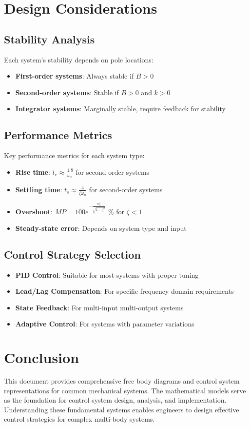 \documentclass[12pt,letterpaper]{article}
\begin{document}
\section{Design Considerations}

\subsection{Stability Analysis}
Each system's stability depends on pole locations:
\begin{itemize}
    \item \textbf{First-order systems}: Always stable if $B > 0$
    \item \textbf{Second-order systems}: Stable if $B > 0$ and $k > 0$
    \item \textbf{Integrator systems}: Marginally stable, require feedback for stability
\end{itemize}

\subsection{Performance Metrics}
Key performance metrics for each system type:
\begin{itemize}
    \item \textbf{Rise time}: $t_r \approx \frac{1.8}{\omega_n}$ for second-order systems
    \item \textbf{Settling time}: $t_s \approx \frac{4}{\zeta\omega_n}$ for second-order systems
    \item \textbf{Overshoot}: $MP = 100e^{-\frac{\pi\zeta}{\sqrt{1-\zeta^2}}}$ \% for $\zeta < 1$
    \item \textbf{Steady-state error}: Depends on system type and input
\end{itemize}

\subsection{Control Strategy Selection}
\begin{itemize}
    \item \textbf{PID Control}: Suitable for most systems with proper tuning
    \item \textbf{Lead/Lag Compensation}: For specific frequency domain requirements
    \item \textbf{State Feedback}: For multi-input multi-output systems
    \item \textbf{Adaptive Control}: For systems with parameter variations
\end{itemize}

\section{Conclusion}

This document provides comprehensive free body diagrams and control system representations for common mechanical systems. The mathematical models serve as the foundation for control system design, analysis, and implementation. Understanding these fundamental systems enables engineers to design effective control strategies for complex multi-body systems.
\end{document}
